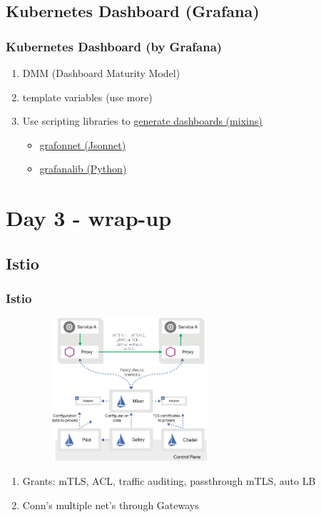 \documentclass[default]{beamer}
\begin{document}
\subsection{Kubernetes Dashboard (Grafana)}
\begin{frame}
  \frametitle{Kubernetes Dashboard (by Grafana)\footnotemark}
  \begin{enumerate}
    \item DMM (Dashboard Maturity Model)
    \item template variables (use more)
    \item Use scripting libraries to \href{https://www.youtube.com/watch?v=GDdnL5R_l-Y}{generate dashboards (mixins)}
    \begin{itemize}
      \item \href{https://github.com/grafana/grafonnet-lib}{grafonnet (Jsonnet)}
      \item \href{https://github.com/weaveworks/grafanalib}{grafanalib (Python)}
    \end{itemize}
  \end{enumerate}
\end{frame}


\section{Day 3 - wrap-up}


\subsection{Istio}
\begin{frame}
  \frametitle{Istio\footnotemark}
  \begin{figure}
    \includegraphics[width=200pt,height=150pt]{src/kubecon/static/istio2.png}
  \end{figure}
  \begin{enumerate}
    \item Grants: mTLS, ACL, traffic auditing, passthrough mTLS, auto LB
    \item Conn's multiple net's through Gateways
  \end{enumerate}
\end{frame}
\end{document}
